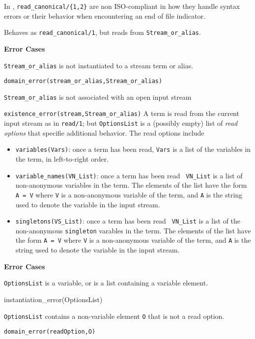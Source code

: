 \begin{description}
In \version, {\tt read\_canonical/\{1,2\}} are non ISO-compliant in how they
handle syntax errors or their behavior when encountering an end of
file indicator.

Behaves as {\tt read\_canonical/1}, but reads from {\tt Stream\_or\_alias}.

{\bf Error Cases}
\bi
\item 	{\tt Stream\_or\_alias} is not instantiated to a stream term or alias.
\bi
\item 	{\tt domain\_error(stream\_or\_alias,Stream\_or\_alias)}
\ei
\item 	{\tt Stream\_or\_alias} is not associated with an open input stream
\bi
\item 	{\tt existence\_error(stream,Stream\_or\_alias)}
\ei
\ei
%
A term is read from the current input stream as in {\tt read/1}; but
{\tt OptionsList} is a (possibly empty) list of {\em read options}
that specifie additional behavior.  The read options include
\begin{itemize}
\item {\tt variables(Vars)}: once a term has been read, {\tt Vars} is a
list of the variables in the term, in left-to-right order. 
\item {\tt variable\_names(VN\_List)}: once a term has been read {\tt
VN\_List} is a list of non-anonymous variables in the term.  The
elements of the list have the form {\tt A = V} where {\tt V} is a
non-anonymous variable of the term, and {\tt A} is the string used to
denote the variable in the input stream.
\item {\tt singletons(VS\_List)}: once a term has been read {\tt
VN\_List} is a list of the non-anonymous {\tt singleton} varables in
the term.  The elements of the list have the form {\tt A = V} where
{\tt V} is a non-anonymous variable of the term, and {\tt A} is the
string used to denote the variable in the input stream.
\end{itemize}

{\bf Error Cases}
\bi
\item 	{\tt OptionsList} is a variable, or is a list containing a
	variable element. 
\bi 
\item instantiation\_error(OptionsList)
\ei
\item     {\tt OptionsList} contains a non-variable element {\tt O} that is not
	a read option.
\bi
\item 	{\tt domain\_error(readOption,O)}
\ei
\ei


\end{description}

